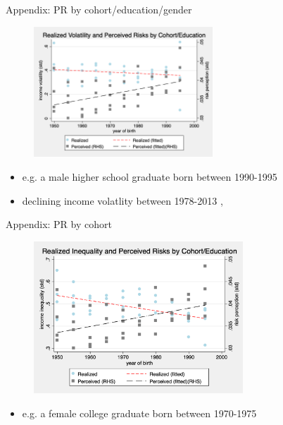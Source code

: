 \documentclass{beamer}
\begin{document}
\begin{frame}{Appendix: PR by cohort/education/gender}
	\label{cohort_compare}
	\begin{figure}[ht]
		\label{appendix: compare_by_cohort}
		\centering
		\includegraphics[width=0.6\textwidth]{figures/real_log_wage_shk_gr_by_byear_5yr_edu_gender_compare.png}
	\end{figure}
	\begin{itemize}
		\item e.g. a male higher school graduate born between 1990-1995 \quad \hyperlink{appendix:cohort_compare_figure}{}   
		\quad \hyperlink{appendix1:cohort_edu_compare_figure}{}   
		\quad \hyperlink{appendix2:cohort_edu_compare_figure}{}     \quad  \hyperlink{age_compare}{} 
		\item declining income volatlity between 1978-2013 \cite{sabelhaus2010great}, \cite{bloom2018great} 
	\end{itemize}
\end{frame}

\begin{frame}{Appendix: PR by cohort}
	\begin{figure}[ht]
		\label{appendix:cohort_compare_figure}
		\centering
		\includegraphics[width=0.7\textwidth]{figures/real_log_wage_shk_by_byear_5yr_edu_gender_compare.png}
	\end{figure}
	\begin{itemize}
		\item e.g. a female college graduate born between 1970-1975   \quad  \hyperlink{cohort_compare}{} 
	\end{itemize}
\end{frame}
\end{document}
